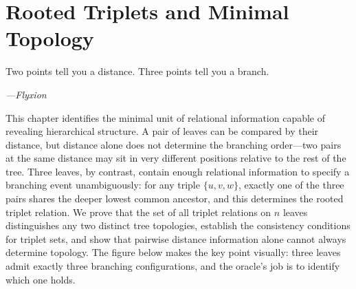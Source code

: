 \chapter{Rooted Triplets and Minimal Topology}
\label{ch:triplets}

\epigraph{%
  Two points tell you a distance. Three points tell you a branch.%
}{\textit{---Flyxion}}

This chapter identifies the minimal unit of relational information capable of revealing hierarchical structure. A pair of leaves can be compared by their distance, but distance alone does not determine the branching order---two pairs at the same distance may sit in very different positions relative to the rest of the tree. Three leaves, by contrast, contain enough relational information to specify a branching event unambiguously: for any triple $\{u,v,w\}$, exactly one of the three pairs shares the deeper lowest common ancestor, and this determines the rooted triplet relation. We prove that the set of all triplet relations on $n$ leaves distinguishes any two distinct tree topologies, establish the consistency conditions for triplet sets, and show that pairwise distance information alone cannot always determine topology. The figure below makes the key point visually: three leaves admit exactly three branching configurations, and the oracle's job is to identify which one holds.

